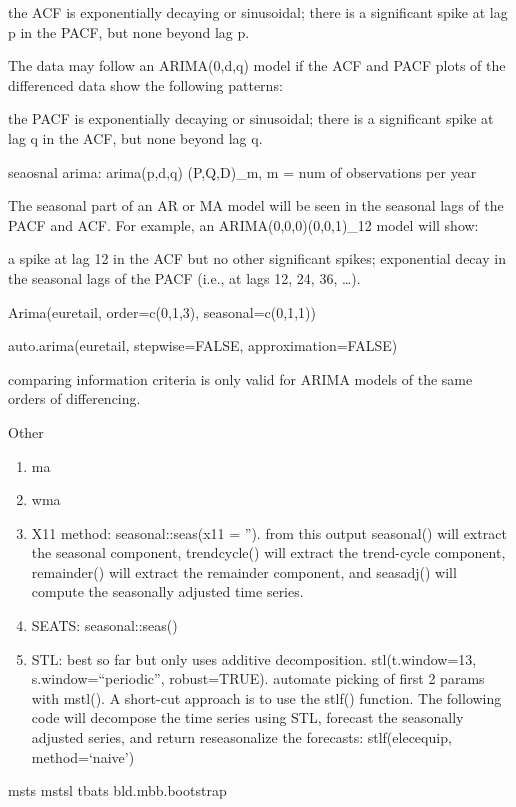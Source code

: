 \documentclass[]{book}
\begin{document}
the ACF is exponentially decaying or sinusoidal; there is a significant
spike at lag p in the PACF, but none beyond lag p.

The data may follow an ARIMA(0,d,q) model if the ACF and PACF plots of
the differenced data show the following patterns:

the PACF is exponentially decaying or sinusoidal; there is a significant
spike at lag q in the ACF, but none beyond lag q.

seaosnal arima: arima(p,d,q) (P,Q,D)\_m, m = num of observations per
year

The seasonal part of an AR or MA model will be seen in the seasonal lags
of the PACF and ACF. For example, an ARIMA(0,0,0)(0,0,1)\_12 model will
show:

a spike at lag 12 in the ACF but no other significant spikes;
exponential decay in the seasonal lags of the PACF (i.e., at lags 12,
24, 36, \ldots{}).

Arima(euretail, order=c(0,1,3), seasonal=c(0,1,1))

auto.arima(euretail, stepwise=FALSE, approximation=FALSE)

comparing information criteria is only valid for ARIMA models of the
same orders of differencing.

Other

\begin{enumerate}
\def\labelenumi{\arabic{enumi}.}
\item
  ma
\item
  wma
\item
  X11 method: seasonal::seas(x11 = ''). from this output seasonal() will
  extract the seasonal component, trendcycle() will extract the
  trend-cycle component, remainder() will extract the remainder
  component, and seasadj() will compute the seasonally adjusted time
  series.
\item
  SEATS: seasonal::seas()
\item
  STL: best so far but only uses additive decomposition.
  stl(t.window=13, s.window=``periodic'', robust=TRUE). automate picking
  of first 2 params with mstl(). A short-cut approach is to use the
  stlf() function. The following code will decompose the time series
  using STL, forecast the seasonally adjusted series, and return
  reseasonalize the forecasts: stlf(elecequip, method=`naive')
\end{enumerate}

msts \textbar{} mstsl \textbar{} tbats \textbar{} bld.mbb.bootstrap
\end{document}
